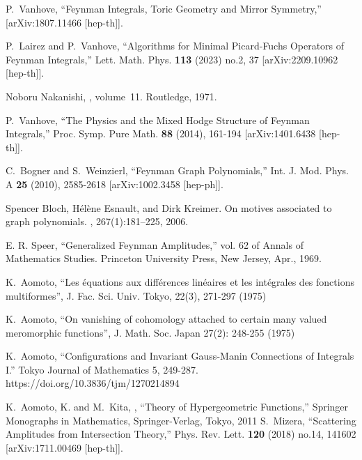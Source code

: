 \documentclass[a4paper,12pt]{article}
\numberwithin{equation}{section}
\numberwithin{figure}{section}
\begin{document}
\begin{thebibliography}{99}
P.~Vanhove,
``Feynman Integrals, Toric Geometry and Mirror Symmetry,''
[arXiv:1807.11466 [hep-th]].
  
P.~Lairez and P.~Vanhove,
``Algorithms for Minimal Picard-Fuchs Operators of Feynman Integrals,''
Lett. Math. Phys. \textbf{113} (2023) no.2, 37
[arXiv:2209.10962 [hep-th]].



Noboru Nakanishi,
, volume~11.
\newblock Routledge, 1971.

  
P.~Vanhove,
``The Physics and the Mixed Hodge Structure of Feynman Integrals,''
Proc. Symp. Pure Math. \textbf{88} (2014), 161-194
[arXiv:1401.6438 [hep-th]].


C.~Bogner and S.~Weinzierl,
``Feynman Graph Polynomials,''
Int. J. Mod. Phys. A \textbf{25} (2010), 2585-2618
[arXiv:1002.3458 [hep-ph]].

  
Spencer Bloch, H{\'e}l{\`e}ne Esnault, and Dirk Kreimer.
\newblock On motives associated to graph polynomials.
,
267(1):181--225, 2006.

  E. R. Speer, ``Generalized Feynman Amplitudes,'' vol. 62 of Annals of Mathematics Studies. Princeton University Press, New Jersey, Apr., 1969.
  


    K.~Aomoto, ``Les \'equations aux diff\'erences
     lin\'eaires et les int\'egrales des fonctions multiformes'',
     J. Fac. Sci. Univ. Tokyo, 22(3), 271-297  (1975)

   K.~Aomoto, ``On vanishing of cohomology attached to
    certain many valued meromorphic functions'', J. Math. Soc. Japan
    27(2): 248-255 (1975)

  
  K.~Aomoto, ``Configurations and Invariant Gauss-Manin Connections of Integrals I.'' Tokyo Journal of Mathematics 5, 249-287. https://doi.org/10.3836/tjm/1270214894

     K.~Aomoto, K. and M.~Kita, , ``Theory of Hypergeometric Functions,'' Springer Monographs in Mathematics, Springer-Verlag, Tokyo, 2011
S.~Mizera,
``Scattering Amplitudes from Intersection Theory,''
Phys. Rev. Lett. \textbf{120} (2018) no.14, 141602
[arXiv:1711.00469 [hep-th]].


\end{thebibliography}
\end{document}

